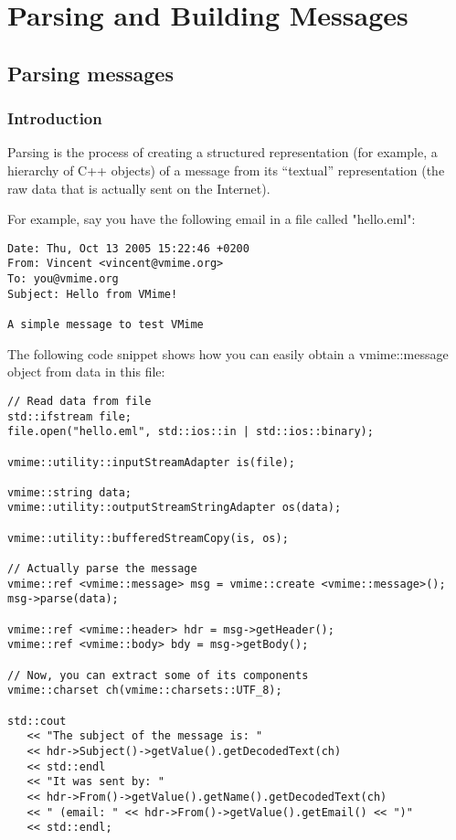 \chapter{Parsing and Building Messages}

\section{Parsing messages}

\subsection{Introduction} %

Parsing is the process of creating a structured representation (for example,
a hierarchy of C++ objects) of a message from its ``textual'' representation
(the raw data that is actually sent on the Internet).

For example, say you have the following email in a file called "hello.eml":

\begin{verbatim}
Date: Thu, Oct 13 2005 15:22:46 +0200
From: Vincent <vincent@vmime.org>
To: you@vmime.org
Subject: Hello from VMime!

A simple message to test VMime
\end{verbatim}

The following code snippet shows how you can easily obtain a
{\vcode vmime::message} object from data in this file:

\begin{lstlisting}[caption={Parsing a message from a file}]
// Read data from file
std::ifstream file;
file.open("hello.eml", std::ios::in | std::ios::binary);

vmime::utility::inputStreamAdapter is(file);

vmime::string data;
vmime::utility::outputStreamStringAdapter os(data);

vmime::utility::bufferedStreamCopy(is, os);

// Actually parse the message
vmime::ref <vmime::message> msg = vmime::create <vmime::message>();
msg->parse(data);

vmime::ref <vmime::header> hdr = msg->getHeader();
vmime::ref <vmime::body> bdy = msg->getBody();

// Now, you can extract some of its components
vmime::charset ch(vmime::charsets::UTF_8);

std::cout
   << "The subject of the message is: "
   << hdr->Subject()->getValue().getDecodedText(ch)
   << std::endl
   << "It was sent by: "
   << hdr->From()->getValue().getName().getDecodedText(ch)
   << " (email: " << hdr->From()->getValue().getEmail() << ")"
   << std::endl;
\end{lstlisting}

